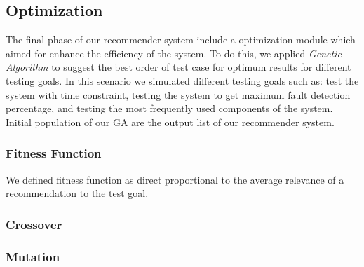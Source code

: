\subsection{Optimization}
The final phase of our recommender system include a optimization module 
which aimed for enhance the efficiency of the system.
To do this, we applied \textit{Genetic Algorithm} to suggest the best order of test
case for optimum results for different testing goals.
In this scenario we simulated different testing goals such as:
test the system with time constraint, testing the system to get maximum 
fault detection percentage, and testing the most frequently used components of the system. 
Initial population of our GA are the output list of our recommender system. 

%
%	


\subsubsection{Fitness Function}

We defined fitness function as direct proportional to 
the average relevance of a recommendation to the test goal. 

\subsubsection{Crossover}

\subsubsection{Mutation}






